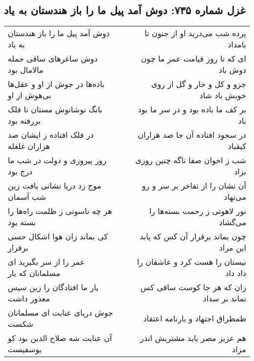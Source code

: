\begin{center}
\section*{غزل شماره ۷۳۵: دوش آمد پیل ما را باز هندستان به یاد}
\label{sec:0735}
\begin{longtable}{l p{0.5cm} r}
دوش آمد پیل ما را باز هندستان به یاد
&&
پرده شب می‌درید او از جنون تا بامداد
\\
دوش ساغرهای ساقی جمله مالامال بود
&&
ای که تا روز قیامت عمر ما چون دوش باد
\\
باده‌ها در جوش از او و عقل‌ها بی‌هوش از او
&&
جزو و کل و خار و گل از روی خوبش باد شاد
\\
بانگ نوشانوش مستان تا فلک بررفته بود
&&
بر کف ما باده بود و در سر ما بود باد
\\
در فلک افتاده ز ایشان صد هزاران غلغله
&&
در سجود افتاده آن جا صد هزاران کیقباد
\\
روز پیروزی و دولت در شب ما درج بود
&&
شب ز اخوان صفا ناگه چنین روزی بزاد
\\
موج زد دریا نشانی یافت زین شب آسمان
&&
آن نشان را از تفاخر بر سر و رو می‌نهاد
\\
هر چه ناسوتی ز ظلمت راه‌ها را بسته بود
&&
نور لاهوتی ز رحمت بسته‌ها را می‌گشاد
\\
کی بماند زان هوا اشکال حسی برقرار
&&
چون بماند برقرار آن کس که یابد این مراد
\\
عمر را از سر بگیرید ای مسلمانان که یار
&&
نیستان را هست کرد و عاشقان را داد داد
\\
یار ما افتادگان را زین سپس معذور داشت
&&
زان که هر جا کوست ساقی کس نماند بر سداد
\\
جوش دریای عنایت ای مسلمانان شکست
&&
طمطراق اجتهاد و بارنامه اعتقاد
\\
آن عنایت شه صلاح الدین بود کو یوسفیست
&&
هم عزیز مصر باید مشتریش اندر مزاد
\\
\end{longtable}
\end{center}
